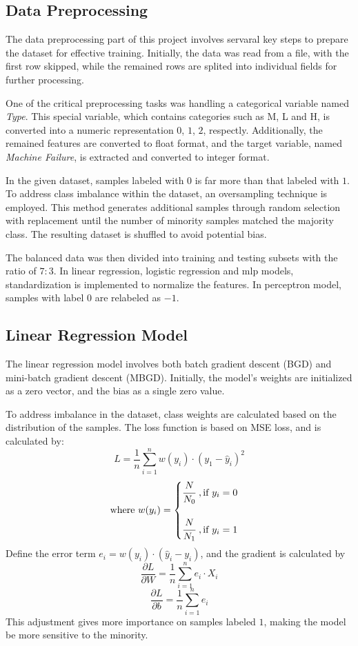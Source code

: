 \documentclass{article}
\begin{document}
\subsection{Data Preprocessing}

The data preprocessing part of this project involves servaral key steps to prepare
the dataset for effective training. Initially, the data was read from a file, with the
first row skipped, while the remained rows are splited into individual fields for
further processing.

One of the critical preprocessing tasks was handling a categorical variable named \textit{Type}.
This special variable, which contains categories such as M, L and H, is converted
into a numeric representation $0$, $1$, $2$, respectly. Additionally, the remained
features are converted to float format, and the target variable, named \textit{Machine Failure},
is extracted and converted to integer format.

In the given dataset, samples labeled with $0$ is far more than that labeled with $1$.
To address class imbalance within the dataset, an oversampling technique is employed.
This method generates additional samples through random selection with replacement until
the number of minority samples matched the majority class. The resulting dataset is
shuffled to avoid potential bias.

The balanced data was then divided into training and testing subsets with the ratio of $7:3$.
In linear regression, logistic regression and mlp models, standardization is 
implemented to normalize the features. In perceptron model, samples with label $0$
are relabeled as $-1$.

\subsection{Linear Regression Model}

The linear regression model involves both batch gradient descent (BGD) and mini-batch gradient descent
(MBGD). Initially, the model's weights are initialized as a zero vector, and the bias
as a single zero value.

To address imbalance in the dataset, class weights are calculated based on the
distribution of the samples. The loss function is based on MSE loss, and is calculated by:
$$
L=\frac{1}{n}\sum_{i=1}^n w(y_i)\cdot (y_1-\hat{y}_i)^2
$$
$$
\text{where}\ 
w(y_i)=\begin{cases}
    \cfrac{N}{N_0}\ , \text{if}\  y_i=0\\ \\
    \cfrac{N}{N_1}\ , \text{if}\  y_i=1
\end{cases}
$$
Define the error term $e_i=w(y_i)\cdot (\hat{y}_i-y_i)$, and the gradient is calculated by
$$
\frac{\partial L}{\partial W}=\frac{1}{n}\sum_{i=1}^n e_i\cdot X_i
$$
$$
\frac{\partial L}{\partial b}=\frac{1}{n}\sum_{i=1}^n e_i
$$
This adjustment gives more importance on samples labeled $1$, making the model be more
sensitive to the minority.
\end{document}
